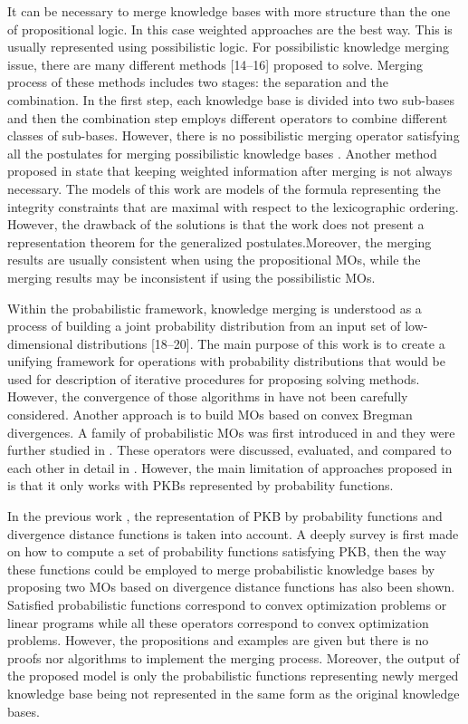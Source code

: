 \documentclass[]{iosart2c}
\begin{document}
  It can be necessary to merge knowledge bases with more structure than the one of propositional logic. In this case
  weighted approaches are the best way. This is usually represented using possibilistic logic. For possibilistic
  knowledge merging issue, there are many different methods [14–16] proposed to solve. Merging process of these
  methods includes two stages: the separation and the combination. In the first step, each knowledge base is divided
  into two sub-bases and then the combination step employs different operators to combine different classes of
  sub-bases. However, there is no possibilistic merging operator satisfying all the postulates for merging possibilistic
  knowledge bases \cite{16}. Another method proposed in \cite{17} state that keeping weighted information after merging
  is not always necessary. The models of this work are models of the formula representing the integrity constraints
  that are maximal with respect to the lexicographic ordering. However, the drawback of the solutions is that the work
  does not present a representation theorem for the generalized postulates.Moreover, the merging results are usually
  consistent when using the propositional MOs, while the merging results may be inconsistent if using the possibilistic
  MOs.

  Within the probabilistic framework, knowledge merging is understood as a process of building a joint probability
  distribution from an input set of low-dimensional distributions [18–20]. The main purpose of this work is to create
  a unifying framework for operations with probability distributions that would be used for description of iterative
  procedures for proposing solving methods. However, the convergence of those algorithms in \cite{18} \cite{19} \cite{20} have not been
  carefully considered. Another approach is to build MOs based on convex Bregman divergences. A family of probabilistic
  MOs was first introduced in \cite{21} and they were further studied in \cite{22} \cite{23}. These operators were discussed,
  evaluated, and compared to each other in detail in \cite{23}. However, the main limitation of approaches proposed
  in \cite{21} \cite{22} \cite{23} is that it only works with PKBs represented by probability functions.

  In the previous work \cite{24}, the representation of PKB by probability functions and divergence distance functions
  is taken into account. A deeply survey is first made on how to compute a set of probability functions satisfying PKB,
  then the way these functions could be employed to merge probabilistic knowledge bases by proposing two MOs based on
  divergence distance functions has also been shown. Satisfied probabilistic functions correspond to convex optimization
  problems or linear programs while all these operators correspond to convex optimization problems. However, the
  propositions and examples are given but there is no proofs nor algorithms to implement the merging process. Moreover,
  the output of the proposed model is only the probabilistic functions representing newly merged knowledge base being
  not represented in the same form as the original knowledge bases.
\end{document}
